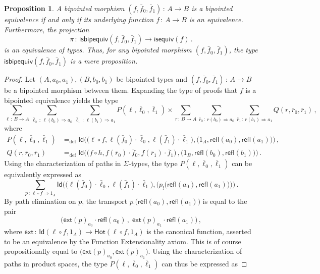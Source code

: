 \documentclass[10pt,a4paper,oneside,reqno]{amsart}
\theoremstyle{mythm}
\newtheorem{proposition}[theorem]{Proposition}
\theoremstyle{mydef}
\theoremstyle{myrmk}
\newcommand{\defeq}{=_{\mathrm{def}}}
\newcommand{\co}{\,{:}\,}
\newcommand{\com}{\circ}
\newcommand{\ct}{\cdot}
\newcommand{\isequiv}{\mathsf{isequiv}}
\newcommand{\Hot}{\mathsf{Hot}}
\newcommand{\ext}{\mathsf{ext}}
\newcommand{\Id}{\mathsf{Id}}
\newcommand{\refl}{\mathsf{refl}}
\newcommand{\isbipequiv}{\mathsf{isbipequiv}}
\begin{document}
\begin{proposition}\label{BoolAlgSpace}  \label{thm:usemere}
A bipointed morphism $(f, \bar{f}_0, \bar{f}_1) \co A \to B$ is a bipointed equivalence if and only
if its underlying function $f \co A \to B$ is an equivalence. Furthermore, the projection
\[
\pi \co \isbipequiv(f, \bar{f}_0, \bar{f}_1)  \to \isequiv(f) \, .
\]
is an equivalence of types. Thus, for any bipointed morphism $(f, \bar{f}_0, \bar{f}_1)$, the type $\isbipequiv(f, \bar{f}_0, \bar{f}_1)$ is a mere proposition.
\end{proposition}  

\begin{proof}
Let $(A,a_0,a_1), (B,b_0,b_1)$ be bipointed types and $(f, \bar{f}_0, \bar{f}_1) \co A \to B$ be a bipointed morphism between them. Expanding the type of 
proofs that $f$ is a bipointed equivalence yields the type
\[
 \sum_{\ell \co B \to  A}  
 \sum_{\bar{\ell}_0 \co \ell(b_0) \Rightarrow a_0} 
 \sum_{\bar{\ell}_1 \co \ell(b_1) \Rightarrow a_1} 
 P(\ell,\bar{\ell}_0,\bar{\ell}_1) \times 
 \sum_{r \co B \to A} 
 \sum_{\bar{r}_0 \co r(b_0) \Rightarrow a_0} 
 \sum_{\bar{r}_1 \co  r(b_1) \Rightarrow a_1} 
 Q(r,\bar{r}_0,\bar{r}_1)   \, ,
\]
where
\begin{align*}
P(\ell,\bar{\ell}_0,\bar{\ell}_1) & \defeq \Id \Big( \big( \ell \com f, \ell(\bar{f}_0) \ct \bar{\ell}_0, \ell(\bar{f}_1) \ct \bar{\ell}_1\big), \big( 1_A, \refl(a_0), \refl(a_1) \big) \Big)  \, , \\
Q(r,\bar{r}_0,\bar{r}_1) & \defeq \Id \Big( \big( f \com h,   f(\bar{r}_0) \ct \bar{f}_0, f(\bar{r}_1) \ct \bar{f}_1  \big) \, , \big( 1_B, \refl(b_0), \refl(b_1) \big) \Big) \, .
\end{align*}
Using the characterization of paths in $\Sigma$-types, the type $P(\ell,\bar{\ell}_0,\bar{\ell}_1)$ can be equivalently expressed as
\[
\sum_{p \co \ell \com f \Rightarrow 1_A}  
\Id \Big(  \big( \ell (\bar{f}_0) \ct \bar{\ell }_0, \ell (\bar{f}_1) \ct \bar{\ell }_1\big), \big( p_{!}\big(\refl(a_0), \refl(a_1) \big) \big) \Big) \, .
\]
By path elimination on $p$, the transport $p_{!}\big(\refl(a_0), \refl(a_1) \big)$ is equal to the pair 
\[
\big(  \ext(p)_{a_0} \ct \refl(a_0) \, , \;  \ext(p)_{a_1} \ct \refl(a_1) \big) \, ,
\]
where $\ext \co \Id(\ell \com f, 1_A) \to \Hot(\ell \com f,  1_A)$ is the canonical function, asserted to be an equivalence by the Function Extensionality axiom. This is of course propositionally equal to $\big(\ext(p)_{a_0}, \ext(p)_{a_1} \big)$. Using the characterization of paths in product spaces, the type $P(\ell,\bar{\ell}_0,\bar{\ell}_1)$ can thus be expressed as

\end{proof}
\end{document}
